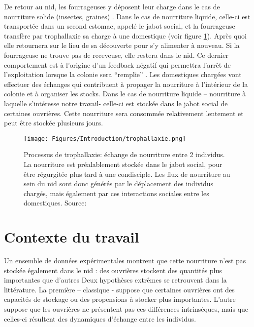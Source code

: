 De retour au nid, les fourrageuses y déposent leur charge dans le cas de nourriture solide (insectes, graines) \citep{reyes-lopez_food_2002}. Dans le cas de nourriture liquide, celle-ci est transportée dans un second estomac, appelé le jabot social, et la fourrageuse transfère par trophallaxie sa charge à une domestique (voir figure \ref{trophallaxie}). Après quoi elle retournera sur le lieu de sa découverte pour s'y alimenter à nouveau. Si la fourrageuse ne trouve pas de receveuse, elle restera dans le nid. Ce dernier comportement est à l'origine d'un feedback négatif qui permettra l'arrêt de l'exploitation lorsque la colonie sera ``remplie'' \citep{mailleux_impact_2010}. Les domestiques chargées vont effectuer des échanges qui contribuent à propager la nourriture à l'intérieur de la colonie et à organiser les stocks. Dans le cas de nourriture liquide – nourriture à laquelle s'intéresse notre travail- celle-ci est stockée dans le jabot social de certaines ouvrières. Cette nourriture sera consommée relativement lentement et peut être stockée plusieurs jours. \\

\begin{figure}[h]
\centering
\texttt{[image: Figures/Introduction/trophallaxie.png]}
\caption{Processus de trophallaxie: échange de nourriture entre 2 individus. La nourriture est préalablement stockée dans le jabot social, pour être régurgitée plus tard à une condisciple. Les flux de nourriture au sein du nid sont donc générés par le déplacement des individus chargés, mais également par ces interactions sociales entre les domestiques.  Source: \citep{holldobler_ants_1990}}
\label{trophallaxie}
\end{figure}


\section{Contexte du travail}

Un ensemble de données expérimentales montrent que cette nourriture n'est pas stockée également dans le nid : des ouvrières stockent des quantités plus importantes que d'autres \citep{buffin_feeding_2009,buffin_collective_2012} Deux hypothèses extrêmes se retrouvent dans la littérature. La première – classique - suppose que certaines ouvrières ont des capacités de stockage ou des propensions à stocker plus importantes. L'autre suppose que les ouvrières ne présentent pas ces différences intrinsèques, mais que celles-ci résultent des dynamiques d'échange entre les individus.\\


